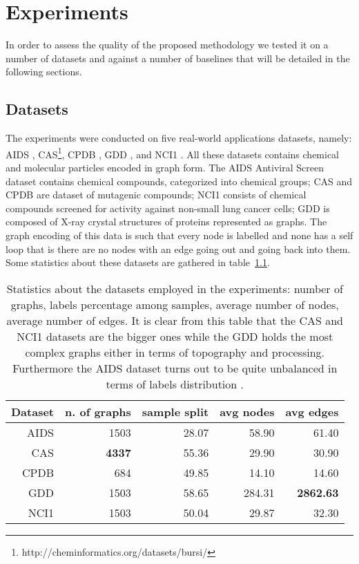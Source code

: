 
\chapter{Experiments}
\label{Chapter4}

In order to assess the quality of the proposed methodology we tested it on a
number of datasets and against a number of baselines that will be detailed in
the following sections.

\section{Datasets}
\label{subsec:datasets}

The experiments were conducted on five real-world applications datasets, namely:
AIDS \cite{Weislow19041989}, CAS\footnote{http://cheminformatics.org/datasets/bursi/},
CPDB \cite{journals/jcisd/HelmaCKR04}, GDD \cite{dobson2003}, and NCI1 \cite{journals/kais/WaleWK08}.
All these datasets contains chemical and molecular particles encoded in graph form.
The AIDS Antiviral Screen dataset contains chemical compounds, categorized
into chemical groups; CAS and CPDB are dataset of mutagenic
compounds; NCI1 consists of chemical compounds screened for activity against 
non-small lung cancer cells; GDD is composed of X-ray crystal structures of
proteins represented as graphs.
The graph encoding of this data is such that every node is labelled and none
has a self loop that is there are no nodes with an edge going out and going back
into them.
Some statistics about these datasets are gathered in table~\ref{table:datasets}.

    \begin{table}[ht]
        \centering
        \begin{tabular}{|r|r|r|r|r|}
            \hline
            Dataset & n. of graphs & sample split & avg nodes & avg edges \\ \hline
            AIDS    & 1503         & 28.07        & 58.90     & 61.40     \\ \hline      
            CAS     & \textbf{4337} & 55.36        & 29.90     & 30.90     \\ \hline      
            CPDB    &  684         & 49.85        & 14.10     & 14.60     \\ \hline      
            GDD     & 1503         & 58.65        & 284.31    & \textbf{2862.63}   \\ \hline      
            NCI1    & 1503         & 50.04        & 29.87     & 32.30     \\ \hline      
        \end{tabular}
        \caption{Statistics about the datasets employed in the experiments: number
        of graphs, labels percentage among samples, average number of nodes, average
        number of edges. It is clear from this table that the CAS and NCI1 datasets
        are the bigger ones while the GDD holds the most complex graphs either in
        terms of topography and processing. Furthermore the AIDS dataset turns out
        to be quite unbalanced in terms of labels distribution \cite{rtesselli}.}
        \label{table:datasets}
    \end{table}

